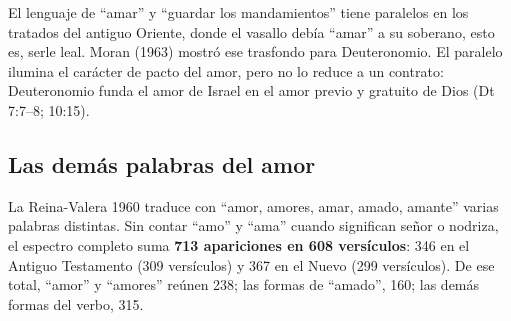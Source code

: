 \documentclass[11pt,letterpaper]{article}
\begin{document}
\begin{nota}[Precisión]
El lenguaje de ``amar'' y ``guardar los mandamientos'' tiene paralelos en los tratados del antiguo Oriente, donde el vasallo debía ``amar'' a su soberano, esto es, serle leal. Moran (1963) mostró ese trasfondo para Deuteronomio. El paralelo ilumina el carácter de pacto del amor, pero no lo reduce a un contrato: Deuteronomio funda el amor de Israel en el amor previo y gratuito de Dios (Dt 7:7--8; 10:15).
\end{nota}

\subsection{Las demás palabras del amor}
La Reina-Valera 1960 traduce con ``amor, amores, amar, amado, amante'' varias palabras distintas. Sin contar ``amo'' y ``ama'' cuando significan señor o nodriza, el espectro completo suma \textbf{713 apariciones en 608 versículos}: 346 en el Antiguo Testamento (309 versículos) y 367 en el Nuevo (299 versículos). De ese total, ``amor'' y ``amores'' reúnen 238; las formas de ``amado'', 160; las demás formas del verbo, 315.
\end{document}

